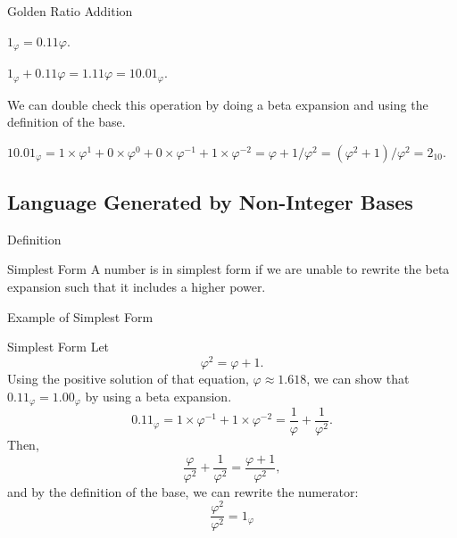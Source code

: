 \documentclass{beamer}
\begin{document}
\begin{frame}{Golden Ratio Addition}
  \begin{example}\pause
    $1_\varphi = 0.11\varphi.$\pause

    $1_\varphi + 0.11\varphi = 1.11\varphi = 10.01_\varphi.$\pause

    We can double check this operation by doing a beta expansion and using the definition of the base.\pause

    $10.01_\varphi = 1\times\varphi^1+0\times\varphi^0+0\times\varphi^{-1}+1\times\varphi^{-2}=\varphi + 1/\varphi^2 = (\varphi^2 + 1)/\varphi^2 = 2_{10}.$
  \end{example}
\end{frame}










\subsection{Language Generated by Non-Integer Bases}
\begin{frame}{Definition}
  \begin{block}{Simplest Form}
    A number is in simplest form if we are unable to rewrite the beta expansion such that it includes a higher power.
  \end{block}
\end{frame}

\begin{frame}{Example of Simplest Form}
  \begin{block}{Simplest Form}
    Let $$\varphi^2 = \varphi + 1.$$ \pause
    Using the positive solution of that equation, $\varphi \approx 1.618$, we can show that $0.11_\varphi = 1.00_\varphi$ by using a beta expansion. \pause
    $$0.11_\varphi = 1\times\varphi^{-1} + 1\times\varphi^{-2} = \frac{1}{\varphi} + \frac{1}{\varphi^2}.$$ \pause
    Then,
    $$\frac{\varphi}{\varphi^2} + \frac{1}{\varphi^2} = \frac{\varphi+1}{\varphi^2},$$\pause
    and by the definition of the base, we can rewrite the numerator:
    $$\frac{\varphi^2}{\varphi^2} = 1_\varphi$$
  \end{block}
\end{frame}
\end{document}
